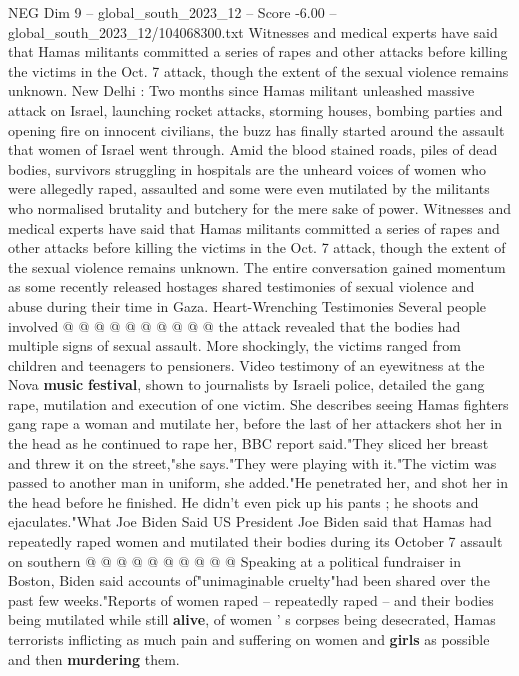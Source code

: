 \begin{textsample}{NEG Dim 9 – global\_south\_2023\_12 – Score -6.00 – global\_south\_2023\_12/104068300.txt}  \label{ex:f9_neg_304}
Witnesses and medical experts have said that Hamas militants committed a series of rapes and other attacks before killing the victims in the Oct. 7 attack, though the extent of the sexual violence remains unknown.
New Delhi : Two months since Hamas militant unleashed massive attack on Israel, launching rocket attacks, storming houses, bombing parties and opening fire on innocent civilians, the buzz has finally started around the assault that women of Israel went through.
Amid the blood stained roads, piles of dead bodies, survivors struggling in hospitals are the unheard voices of women who were allegedly raped, assaulted and some were even mutilated by the militants who normalised brutality and butchery for the mere sake of power.
Witnesses and medical experts have said that Hamas militants committed a series of rapes and other attacks before killing the victims in the Oct. 7 attack, though the extent of the sexual violence remains unknown.
The entire conversation gained momentum as some recently released hostages shared testimonies of sexual violence and abuse during their time in Gaza.
Heart-Wrenching Testimonies Several people involved @ @ @ @ @ @ @ @ @ @ the attack revealed that the bodies had multiple signs of sexual assault.
More shockingly, the victims ranged from children and teenagers to pensioners.
Video testimony of an eyewitness at the Nova \textbf{music} \textbf{festival}, shown to journalists by Israeli police, detailed the gang rape, mutilation and execution of one victim.
She describes seeing Hamas fighters gang rape a woman and mutilate her, before the last of her attackers shot her in the head as he continued to rape her, BBC report said."They sliced her breast and threw it on the street,"she says."They were playing with it."The victim was passed to another man in uniform, she added."He penetrated her, and shot her in the head before he finished.
He didn't even pick up his pants ; he shoots and ejaculates."What Joe Biden Said US President Joe Biden said that Hamas had repeatedly raped women and mutilated their bodies during its October 7 assault on southern @ @ @ @ @ @ @ @ @ @ Speaking at a political fundraiser in Boston, Biden said accounts of"unimaginable cruelty"had been shared over the past few weeks."Reports of women raped -- repeatedly raped -- and their bodies being mutilated while still \textbf{alive}, of women ' s corpses being desecrated, Hamas terrorists inflicting as much pain and suffering on women and \textbf{girls} as possible and then \textbf{murdering} them.

\end{textsample}
